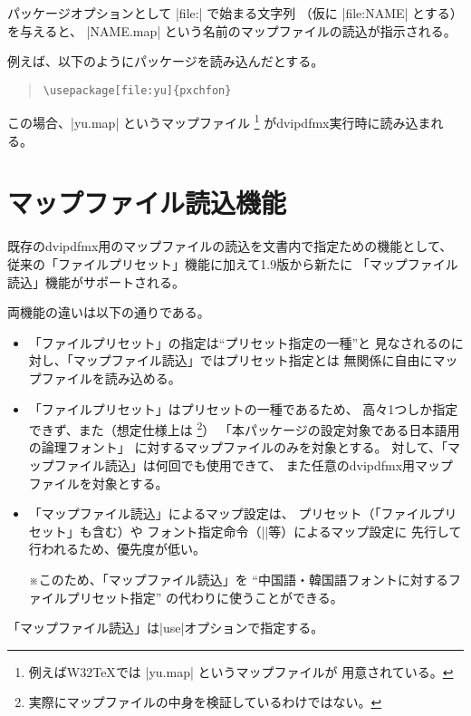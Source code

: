 \documentclass[uplatex,dvipdfmx,a4paper]{jsarticle}
\newcommand{\Note}{\par\noindent ※}
\begin{document}
パッケージオプションとして |file:| で始まる文字列
（仮に |file:NAME| とする）を与えると、
|NAME.map| という名前のマップファイルの読込が指示される。

例えば、以下のようにパッケージを読み込んだとする。

\begin{quote}\small\begin{verbatim}
\usepackage[file:yu]{pxchfon}
\end{verbatim}\end{quote}

この場合、|yu.map| というマップファイル
\footnote{例えばW32{\TeX}では |yu.map| というマップファイルが
  用意されている。}%
がdvipdfmx実行時に読み込まれる。


\section{マップファイル読込機能}
\label{sec:MapFileLoad}

既存のdvipdfmx用のマップファイルの読込を文書内で指定ための機能として、
従来の「ファイルプリセット」機能に加えて1.9版から新たに
「マップファイル読込」機能がサポートされる。

両機能の違いは以下の通りである。
\begin{itemize}
\item 「ファイルプリセット」の指定は“プリセット指定の一種”と
見なされるのに対し、「マップファイル読込」ではプリセット指定とは
無関係に自由にマップファイルを読み込める。
\item 「ファイルプリセット」はプリセットの一種であるため、
高々1つしか指定できず、また（想定仕様上は
\footnote{実際にマップファイルの中身を検証しているわけではない。}）
「本パッケージの設定対象である日本語用の論理フォント」
に対するマップファイルのみを対象とする。
対して、「マップファイル読込」は何回でも使用できて、
また任意のdvipdfmx用マップファイルを対象とする。
\item 「マップファイル読込」によるマップ設定は、
プリセット（「ファイルプリセット」も含む）や
フォント指定命令（|\setminchofont|等）によるマップ設定に
先行して行われるため、優先度が低い。
\Note このため、「マップファイル読込」を
“中国語・韓国語フォントに対するファイルプリセット指定”
の代わりに使うことができる。
\end{itemize}

「マップファイル読込」は|use|オプションで指定する。
\end{document}
